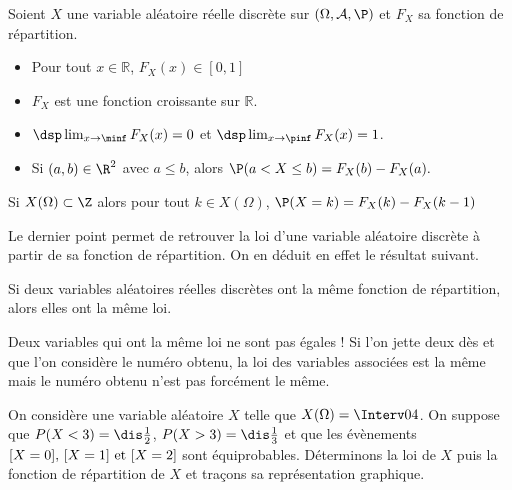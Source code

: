 \documentclass[a4paper,10pt]{report}
\begin{document}
\begin{prop}
Soient $X$ une variable aléatoire réelle discrète sur $(\Omega, \mathcal{A}, \P)$ et $F_X$ sa fonction de répartition.
\begin{itemize}
\item Pour tout $ x \in \mathbb{R}$, $F_X(x) \in [0,1]$
\item $F_X$ est une fonction croissante sur $\mathbb{R}$.
\item $\dsp \lim_{x\to \minf} F_X(x) =0$ et $\dsp \lim_{x\to \pinf} F_X(x) = 1$.
\item Si $(a,b)\in\R^2$ avec $a\leq b$, alors $\P(a < X \leq b) = F_X(b)-F_X(a).$
\end{itemize}
\end{prop}

\begin{preuve}

\vspace{10cm}
\end{preuve}

\begin{rems}
\item Si $X(\Omega)\subset \Z$ alors pour tout $k \in X(\Omega)$, $\P(X=k)= F_X(k)-F_X(k-1)$
\item Le dernier point permet de retrouver la loi d'une variable aléatoire discrète à partir de sa fonction de répartition. On en déduit en effet le résultat suivant.
\end{rems}

\begin{prop}
Si deux variables aléatoires réelles discrètes ont la même fonction de répartition, alors elles ont la même loi.
\end{prop}

\begin{att} Deux variables qui ont la même loi ne sont pas égales ! Si l'on jette deux dès et que l'on considère le numéro obtenu, la loi des variables associées est la même mais le numéro obtenu n'est pas forcément le même.
\end{att}


\begin{ex} On considère une variable aléatoire $X$ telle que $X(\Omega) = \Interv04$. On suppose que $P(X<3) = \dis \frac{1}{2}$, $P(X>3)= \dis \frac{1}{3}$ et que les évènements $[X=0], \, [X=1] \hbox{ et } [X=2]$ sont équiprobables. Déterminons la loi de $X$ puis la fonction de répartition de $X$ et traçons sa représentation graphique.

\vspace{10cm}
\end{ex}
\end{document}
